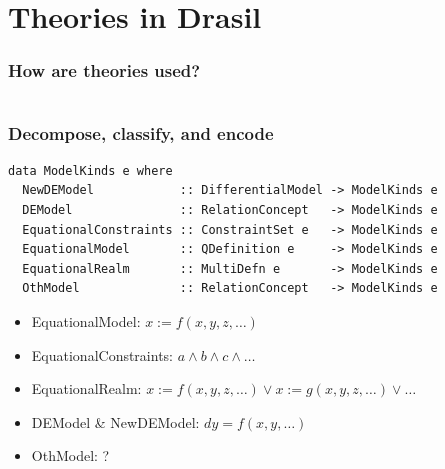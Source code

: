 \documentclass[xcolor={dvipsnames}]{beamer}
\begin{document}
\section{Theories in Drasil}

\begin{frame}
  \frametitle{How are theories used?}

  \begin{columns}
    \begin{column}{0.45\textwidth}

    \end{column}
    \hfill
    \begin{column}{0.45\textwidth}

    \end{column}
  \end{columns}
\end{frame}

\begin{frame}[fragile]
  \frametitle{Decompose, classify, and encode}

\begin{verbatim}
data ModelKinds e where
  NewDEModel            :: DifferentialModel -> ModelKinds e
  DEModel               :: RelationConcept   -> ModelKinds e
  EquationalConstraints :: ConstraintSet e   -> ModelKinds e
  EquationalModel       :: QDefinition e     -> ModelKinds e
  EquationalRealm       :: MultiDefn e       -> ModelKinds e
  OthModel              :: RelationConcept   -> ModelKinds e
\end{verbatim}

  \vspace{0.2cm}

  \begin{itemize}
    \item EquationalModel: \(x := f(x,y,z,\ldots{})\)
    \item EquationalConstraints: \(a \land b \land c \land \ldots{}\)
    \item EquationalRealm: \(x := f(x,y,z,\ldots{}) \lor x := g(x,y,z,\ldots{}) \lor \ldots{}\)
    \item DEModel \& NewDEModel: \(dy = f(x, y, \ldots{})\)
    \item OthModel: ?
  \end{itemize}
\end{frame}
\end{document}

